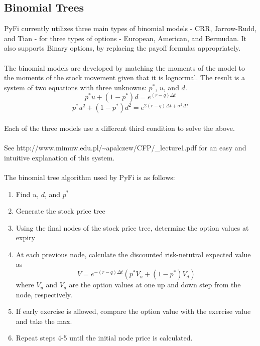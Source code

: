 \documentclass[10pt]{article}
\begin{document}
\subsection{Binomial Trees}
PyFi currently utilizes three main types of binomial models - CRR, Jarrow-Rudd, and Tian - for three
types of options - European, American, and Bermudan. It also supports Binary options, by replacing the
payoff formulas appropriately.\\
\\
The binomial models are developed by matching the moments of the model to the moments of the stock movement given that
it is lognormal. The result is a system of two equations with three unknowns: $p^{*}$, $u$, and $d$.\\
    \begin{equation}
        p^{*}u+(1-p^{*})d = e^{(r-q)\Delta t}
    \end{equation}
    \begin{equation}
        p^{*}u^2 + (1-p^{*})d^2 = e^{2(r-q)\Delta t+\sigma^2\Delta t}
    \end{equation}
\\
Each of the three models use a different third condition to solve the above.\\
\\
See http://www.mimuw.edu.pl/\~{}apalczew/CFP/\_lecture1.pdf for an easy and intuitive explanation of this system.\\
\\
The binomial tree algorithm used by PyFi is as follows:
\begin{enumerate}
    \item Find $u$, $d$, and $p^{*}$
    \item Generate the stock price tree
    \item Using the final nodes of the stock price tree, determine the option values at expiry
    \item At each previous node, calculate the discounted risk-netutral expected value as
        \begin{equation}
            V = e^{-(r-q)\Delta t}(p^{*}V_{u} + (1-p^{*})V_{d})
        \end{equation}
        where $V_{u}$ and $V_{d}$ are the option values at one up and down step from the node, respectively.
    \item If early exercise is allowed, compare the option value with the exercise value and take the max.
    \item Repeat steps 4-5 until the initial node price is calculated.
\end{enumerate}
\end{document}
